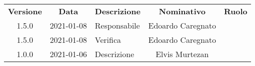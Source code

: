 {
    \renewcommand{\arraystretch}{1.5}
    \centering
    \begin{longtable}{ c c  C{4cm}  c  c }
        \rowcolor{\primaryColor}
        \textcolor{\secondaryColor}{
        \textbf{Versione}}     & \textcolor{\secondaryColor}{\textbf{Data}}       & \textcolor{\secondaryColor}
        {\textbf{Descrizione}} & \textcolor{\secondaryColor}{\textbf{Nominativo}} & \textcolor{\secondaryColor}{\textbf{Ruolo}}                          \\


        1.5.0                  & 2021-01-08                                       & Responsabile                                & Edoardo Caregnato & \responsabile{} \\
        1.5.0                  & 2021-01-08                                       & Verifica                                    & Edoardo Caregnato & \verificatore{} \\
        1.0.0                  & 2021-01-06                                       & Descrizione                            & Elvis Murtezan & \redattore{}    \\
    \end{longtable}
}